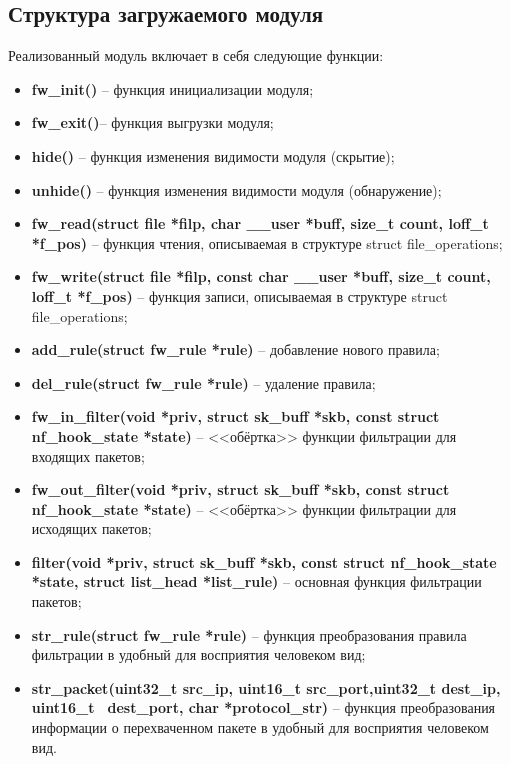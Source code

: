 \subsection{Структура загружаемого модуля}
Реализованный модуль включает в себя следующие функции:
\begin{itemize}
	\item \textbf{fw\_init()} -- функция инициализации модуля;
	
	\item \textbf{fw\_exit()}-- функция выгрузки модуля;
	
	\item \textbf{hide()} -- функция изменения видимости модуля (скрытие);
	
	\item \textbf{unhide()} -- функция изменения видимости модуля (обнаружение);
	
	\item \textbf{fw\_read(struct file *filp, char \_\_user *buff, size\_t count, loff\_t *f\_pos)} -- функция чтения, описываемая в структуре struct file\_operations;
	
	\item \textbf{fw\_write(struct file *filp, const char \_\_user *buff, size\_t count, loff\_t *f\_pos)} -- функция записи, описываемая в структуре struct file\_operations;
	
	\item \textbf{add\_rule(struct fw\_rule *rule)} -- добавление нового правила;
	
	\item \textbf{del\_rule(struct fw\_rule *rule)} -- удаление правила;
	
	\item \textbf{fw\_in\_filter(void *priv, struct sk\_buff *skb, const struct nf\_hook\_state *state)} -- <<обёртка>> функции фильтрации для входящих пакетов;
	
	\item \textbf{fw\_out\_filter(void *priv, struct sk\_buff *skb, const struct nf\_hook\_state *state)} -- <<обёртка>> функции фильтрации для исходящих пакетов;
	
	\item \textbf{filter(void *priv, struct sk\_buff *skb, const struct nf\_hook\_state *state,
	struct list\_head *list\_rule)} -- основная функция фильтрации пакетов;
	
	\item \textbf{str\_rule(struct fw\_rule *rule)} -- функция преобразования правила фильтрации в удобный для восприятия человеком вид;
	
	\item \textbf{str\_packet(uint32\_t src\_ip, uint16\_t src\_port,uint32\_t dest\_ip, uint16\_t \, dest\_port, char *protocol\_str)} -- функция преобразования информации о перехваченном пакете в удобный для восприятия человеком вид. \newline
\end{itemize}

